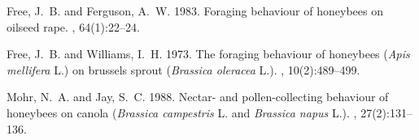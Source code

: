 \documentclass[12pt]{article} %
\begin{document}

\begin{thebibliography}{}

Free, J.~B. and Ferguson, A.~W. 1983.
\newblock Foraging behaviour of honeybees on oilseed rape.
, 64(1):22--24.

Free, J.~B. and Williams, I.~H. 1973.
\newblock The foraging behaviour of honeybees (\emph{Apis mellifera} {L.}) on
  brussels sprout (\emph{Brassica oleracea} {L.}).
, 10(2):489--499.

Mohr, N.~A. and Jay, S.~C. 1988.
\newblock Nectar- and pollen-collecting behaviour of honeybees on canola
  (\emph{Brassica campestris} {L}. and \emph{Brassica napus} {L}.).
, 27(2):131--136.

\end{thebibliography}
\end{document}
